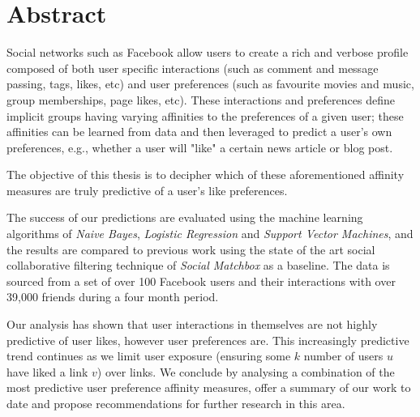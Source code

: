
\chapter*{Abstract}
\label{cha:abstract}

Social networks such as Facebook allow users to create a rich and verbose profile composed of both user specific interactions (such as 
comment and message passing, tags, likes, etc) and user preferences (such as favourite movies and music, group memberships, page likes, etc). 
These interactions and preferences define implicit groups having varying affinities to the preferences of a given user; 
these affinities can be learned from data and then leveraged to predict a user's own preferences, e.g., 
whether a user will "like" a certain news article or blog post.

The objective of this thesis is to decipher which of these aforementioned affinity measures are truly predictive of a user's like preferences.

The success of our predictions are evaluated using the machine learning algorithms of  
\emph{Naive Bayes}, \emph{Logistic Regression} and \emph{Support Vector Machines}, and the results are compared to previous 
work using the state of the art social collaborative filtering technique of \emph{Social Matchbox} as a baseline. 
The data is sourced from a set of over 100 Facebook users and their interactions with over 39,000 friends during a four month period.

Our analysis has shown that user interactions in themselves are not highly predictive of user likes, however user preferences are. 
This increasingly predictive trend continues as we limit user exposure (ensuring some $k$ number of users $u$ have liked a link $v$) over links. 
We conclude by analysing a combination of the most predictive user preference affinity measures, offer a summary of our work to date and propose 
recommendations for further research in this area.

